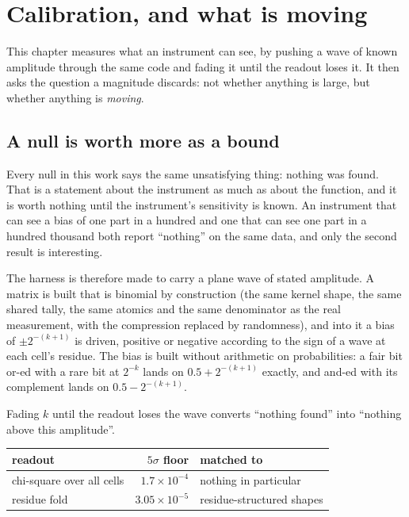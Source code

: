 \chapter{Calibration, and what is moving}

This chapter measures what an instrument can see, by pushing a wave of known amplitude through the
same code and fading it until the readout loses it. It then asks the question a magnitude discards:
not whether anything is large, but whether anything is \emph{moving}.

\section{A null is worth more as a bound}

Every null in this work says the same unsatisfying thing: nothing was found. That is a statement
about the instrument as much as about the function, and it is worth nothing until the instrument's
sensitivity is known. An instrument that can see a bias of one part in a hundred and one that can
see one part in a hundred thousand both report ``nothing'' on the same data, and only the second
result is interesting.

The harness is therefore made to carry a plane wave of stated amplitude. A matrix is built that is
binomial by construction (the same kernel shape, the same shared tally, the same atomics and the
same denominator as the real measurement, with the compression replaced by randomness), and into it
a bias of \(\pm 2^{-(k+1)}\) is driven, positive or negative according to the sign of a wave at each
cell's residue. The bias is built without arithmetic on probabilities: a fair bit or-ed with a rare
bit at \(2^{-k}\) lands on \(0.5 + 2^{-(k+1)}\) exactly, and and-ed with its complement lands on
\(0.5 - 2^{-(k+1)}\).

Fading \(k\) until the readout loses the wave converts ``nothing found'' into ``nothing above this
amplitude''.

\begin{center}
\begin{tabular}{lrl}
\toprule
readout & \(5\sigma\) floor & matched to \\
\midrule
chi-square over all cells & \(1.7 \times 10^{-4}\) & nothing in particular \\
residue fold & \(3.05 \times 10^{-5}\) & residue-structured shapes \\
\bottomrule
\end{tabular}
\end{center}

